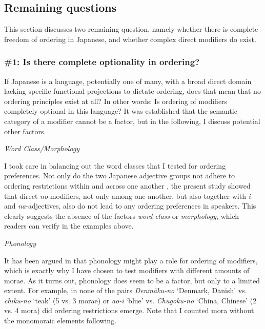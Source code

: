 \documentclass [output=book,colorlinks,citecolor=brown]{langscibook}
\begin{document}
\subsection{Remaining questions} 

This section discusses two remaining question, namely whether there is complete freedom of ordering in Japanese, and whether complex direct modifiers do exist.

\subsubsection{\#1: Is there complete optionality in ordering?} \label{optionality}

If Japanese is a language, potentially one of many, with a broad direct domain lacking specific functional projections to dictate ordering, does that mean that no ordering principles exist at all? In other words: Is ordering of modifiers completely optional in this language? It was established that the semantic category of a modifier cannot be a factor, but in the following, I discuss potential other factors.

\newpage

\emph{Word Class/Morphology}

\par


I took care in balancing out the word classes that I tested for ordering preferences. Not only do the two Japanese adjective groups not adhere to ordering restrictions within and across one another \citep{kohlich:2018:die}, the present study showed that direct \textit{no}-modifiers, not only among one another, but also together with \textit{i}- and \textit{na}-adjectives, also do not lead to any ordering preferences in speakers. This clearly suggests the absence of the factors \textit{word class} or \textit{morphology}, which readers can verify in the examples above.

\emph{Phonology}

\par


It has been argued in \citet{nagano:2016:are} that phonology might play a role for ordering of modifiers, which is exactly why I have chosen to test modifiers with different amounts of morae. As it turns out, phonology does seem to be a factor, but only to a limited extent. For example, in none of the pairs \textit{Denmāku-no} `Denmark, Danish’ vs. \textit{chīku-no} `teak’ (5 vs. 3 morae) or \textit{ao-i} `blue’ vs. \textit{Chūgoku-no} `China, Chinese’ (2 vs. 4 mora) did ordering restrictions emerge. Note that I counted mora without the monomoraic elements following. %
\end{document}
